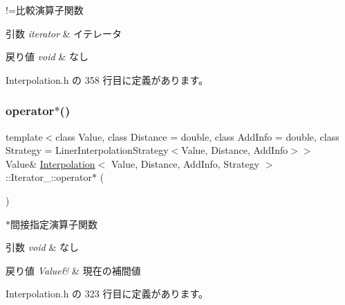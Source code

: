!=比較演算子関数 


\begin{DoxyParams}{引数}
{\em iterator} & イテレータ \\
\hline
\end{DoxyParams}

\begin{DoxyRetVals}{戻り値}
{\em void} & なし \\
\hline
\end{DoxyRetVals}


 Interpolation.\+h の 358 行目に定義があります。

\mbox{\label{class_interpolation_1_1_iterator___adb8f40c63f30301266f26d74742dcbd3}} 
\subsubsection{\texorpdfstring{operator$\ast$()}{operator*()}}
{\footnotesize\ttfamily template$<$class Value, class Distance = double, class Add\+Info = double, class Strategy = Liner\+Interpolation\+Strategy$<$\+Value, Distance, Add\+Info$>$$>$ \\
Value\& \mbox{\hyperlink{class_interpolation}{Interpolation}}$<$ Value, Distance, Add\+Info, Strategy $>$\+::Iterator\+\_\+\+::operator$\ast$ (\begin{DoxyParamCaption}{ }\end{DoxyParamCaption})\hspace{0.3cm}{\ttfamily [inline]}}



$\ast$間接指定演算子関数 


\begin{DoxyParams}{引数}
{\em void} & なし \\
\hline
\end{DoxyParams}

\begin{DoxyRetVals}{戻り値}
{\em Value\&} & 現在の補間値 \\
\hline
\end{DoxyRetVals}


 Interpolation.\+h の 323 行目に定義があります。

\mbox{\label{class_interpolation_1_1_iterator___a3c6e608dce87d136b0d7ed5b933b9db4}} 
